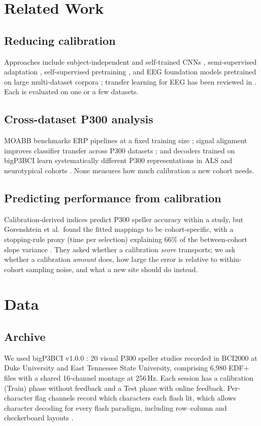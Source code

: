 \documentclass[conference]{IEEEtran}
\begin{document}
\section{Related Work}
\subsection{Reducing calibration}
Approaches include subject-independent and self-trained CNNs \cite{gao2023}, semi-supervised adaptation \cite{chen2026}, self-supervised pretraining \cite{hong2025}, and EEG foundation models pretrained on large multi-dataset corpora \cite{jiang2024}; transfer learning for EEG has been reviewed in \cite{wu2022}. Each is evaluated on one or a few datasets.

\subsection{Cross-dataset P300 analysis}
MOABB benchmarks ERP pipelines at a fixed training size \cite{moabb2024}; signal alignment improves classifier transfer across P300 datasets \cite{song2024}; and decoders trained on bigP3BCI learn systematically different P300 representations in ALS and neurotypical cohorts \cite{jiangx2026}. None measures how much calibration a new cohort needs.

\subsection{Predicting performance from calibration}
Calibration-derived indices predict P300 speller accuracy within a study, but Gorenshtein et al.\ found the fitted mappings to be cohort-specific, with a stopping-rule proxy (time per selection) explaining 66\% of the between-cohort slope variance \cite{gorenshtein2026}. They asked whether a calibration \emph{score} transports; we ask whether a calibration \emph{amount} does, how large the error is relative to within-cohort sampling noise, and what a new site should do instead.

\section{Data}
\subsection{Archive}
We used bigP3BCI v1.0.0 \cite{bigp3bci}: 20 visual P300 speller studies recorded in BCI2000 \cite{schalk2004} at Duke University and East Tennessee State University, comprising 6{,}980 EDF+ files with a shared 16-channel montage at 256\,Hz. Each session has a calibration (Train) phase without feedback and a Test phase with online feedback. Per-character flag channels record which characters each flash lit, which allows character decoding for every flash paradigm, including row--column and checkerboard layouts \cite{townsend2010}.
\end{document}

